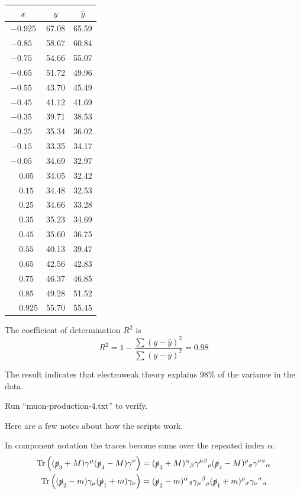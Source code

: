 \documentclass[12pt]{article}
\begin{document}
\begin{center}
\begin{tabular}{|c|c|c|}
\hline
$x$ & $y$ & $\hat{y}$ \\
\hline
$-0.925$ & 67.08 & 65.59\\
$-0.85\phantom{0}$ & 58.67 & 60.84\\
$-0.75\phantom{0}$ & 54.66 & 55.07\\
$-0.65\phantom{0}$ & 51.72 & 49.96\\
$-0.55\phantom{0}$ & 43.70 & 45.49\\
$-0.45\phantom{0}$ & 41.12 & 41.69\\
$-0.35\phantom{0}$ & 39.71 & 38.53\\
$-0.25\phantom{0}$ & 35.34 & 36.02\\
$-0.15\phantom{0}$ & 33.35 & 34.17\\
$-0.05\phantom{0}$ & 34.69 & 32.97\\
$\phantom{+}0.05\phantom{0}$ & 34.05 & 32.42\\
$\phantom{+}0.15\phantom{0}$ & 34.48 & 32.53\\
$\phantom{+}0.25\phantom{0}$ & 34.66 & 33.28\\
$\phantom{+}0.35\phantom{0}$ & 35.23 & 34.69\\
$\phantom{+}0.45\phantom{0}$ & 35.60 & 36.75\\
$\phantom{+}0.55\phantom{0}$ & 40.13 & 39.47\\
$\phantom{+}0.65\phantom{0}$ & 42.56 & 42.83\\
$\phantom{+}0.75\phantom{0}$ & 46.37 & 46.85\\
$\phantom{+}0.85\phantom{0}$ & 49.28 & 51.52\\
$\phantom{+}0.925$ & 55.70 & 55.45\\
\hline
\end{tabular}
\end{center}

\noindent
The coefficient of determination $R^2$ is
\begin{equation*}
R^2=1-\frac{\sum(y-\hat{y})^2}{\sum(y-\bar{y})^2}=0.98
\end{equation*}

\noindent
The result indicates that electroweak theory explains 98\% of the variance in the data.

\bigskip
\noindent
Run ``muon-production-4.txt'' to verify.

\newpage
\noindent
Here are a few notes about how the scripts work.

\bigskip
\noindent
In component notation the traces become sums over the repeated index $\alpha$.
\begin{align*}
\mathop{\rm Tr}\left((\slashed{p}_3+M)\gamma^\mu(\slashed{p}_4-M)\gamma^\nu\right)
&=
(\slashed{p}_3+M)^\alpha{}_\beta
\gamma^{\mu\beta}{}_\rho
(\slashed{p}_4-M)^\rho{}_\sigma
\gamma^{\nu\sigma}{}_\alpha
\\
\mathop{\rm Tr}\left((\slashed{p}_2-m)\gamma_\mu(\slashed{p}_1+m)\gamma_\nu\right)
&=
(\slashed{p}_2-m)^\alpha{}_\beta
\gamma_\mu{}^\beta{}_\rho
(\slashed{p}_1+m)^\rho{}_\sigma
\gamma_\nu{}^\sigma{}_\alpha
\end{align*}
\end{document}

